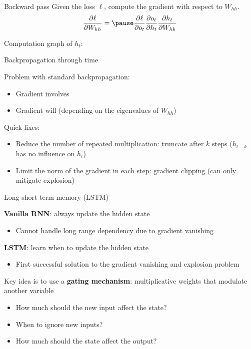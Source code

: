 \documentclass[usenames,dvipsnames,notes,11pt,aspectratio=169,hyperref={colorlinks=true, linkcolor=blue}]{beamer}
\newcommand{\pt}{\partial}
\begin{document}
\begin{frame}
    {Backward pass}
    Given the loss $\ell$, compute the gradient with respect to $W_{hh}$.
    $$
    \frac{\pt\ell}{\pt W_{hh}} = \pause \frac{\pt\ell}{\pt o_t} \frac{\pt o_t}{\pt h_t} \frac{\pt h_t}{\pt W_{hh}}
    $$

    \pause
    Computation graph of $h_t$:
    \vspace{10em}
\end{frame}

\begin{frame}
    {Backpropagation through time}
    
    Problem with standard backpropagation:\\
    \begin{itemize}
        \item Gradient involves 
        \item Gradient will  (depending on the eigenvalues of $W_{hh}$)
    \end{itemize}

    Quick fixes:\\
    \begin{itemize}
        \item Reduce the number of repeated multiplication: truncate after $k$ steps ($h_{t-k}$ has no influence on $h_t$)
        \item Limit the norm of the gradient in each step: gradient clipping (can only mitigate explosion)
    \end{itemize}
\end{frame}

\begin{frame}
    {Long-short term memory (LSTM)}

    \textbf{Vanilla RNN}: always update the hidden state\\
    \begin{itemize}
        \item Cannot handle long range dependency due to gradient vanishing 
    \end{itemize}
    \pause

    \textbf{LSTM}: learn when to update the hidden state\\
    \begin{itemize}
        \item First successful solution to the gradient vanishing and explosion problem 
    \end{itemize}
    \pause

    Key idea is to use a \textbf{gating mechanism}: multiplicative weights that modulate another variable \\
    \begin{itemize}
        \item How much should the new input affect the state?
        \item When to ignore new inputs?
        \item How much should the state affect the output? 
    \end{itemize}
\end{frame}
\end{document}
